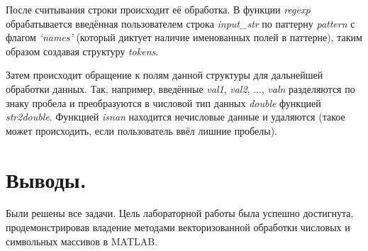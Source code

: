 После считывания строки происходит её обработка. В функции \textit{regexp} обрабатывается введённая пользователем строка \textit{input\_str} по паттерну \textit{pattern} с флагом \textit{‘names’} (который диктует наличие именованных полей в паттерне), таким образом создавая структуру \textit{tokens}.

Затем происходит обращение к полям данной структуры для дальнейшей обработки данных. Так, например, введённые \textit{val1}, \textit{val2}, ..., \textit{valn} разделяются по знаку пробела и преобразуются в числовой тип данных \textit{double} функцией \textit{str2double}. Функцией \textit{isnan} находится нечисловые данные и удаляются (такое может происходить, если пользователь ввёл лишние пробелы).

\section*{Выводы.}

Были решены все задачи. Цель лабораторной работы была успешно достигнута, продемонстрировав владение методами векторизованной обработки числовых и символьных массивов в MATLAB. 